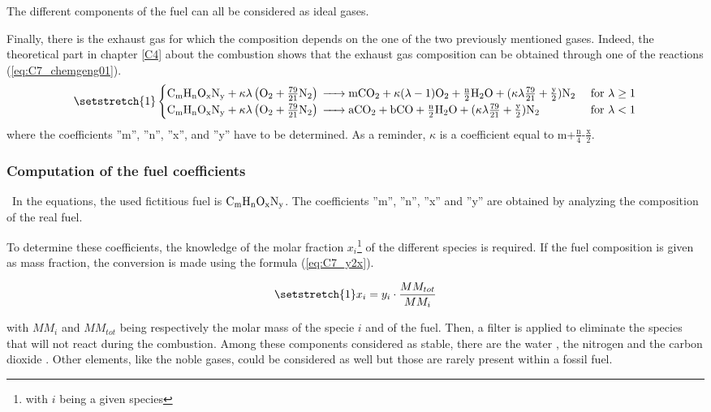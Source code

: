 The different components of the fuel can all be considered as ideal gases. 

Finally, there is the exhaust gas for which the composition depends on the one of the two previously mentioned gases. Indeed, the theoretical part in chapter \ref{C4} about the combustion shows that the exhaust gas composition can be obtained through one of the reactions (\ref{eq:C7_chemgeng01}).
\begin{equation}
    \setstretch{1}
    \begin{cases}
        \ce{C_{\text{m}}H_{\text{n}}O_{\text{x}}N_{\text{y}} +}\kappa\lambda \left(\ce{O2}+\frac{79}{21}\ce{N2}\right) \ce{-> mCO2 +} \kappa(\lambda-1)\ce{O2 + \frac{n}{2}H2O +} (\kappa\lambda\frac{79}{21} + \frac{\text{y}}{2})\ce{N2} & \text{ for \(\lambda\geq 1\)} \\
        \ce{C_{\text{m}}H_{\text{n}}O_{\text{x}}N_{\text{y}} +}\kappa\lambda \left(\ce{O2}+\frac{79}{21}\ce{N2}\right) \ce{-> aCO2 + bCO + \frac{n}{2}H2O} + (\kappa\lambda\frac{79}{21} + \frac{\text{y}}{2})\ce{N2}                      & \text{ for \(\lambda< 1\)}
    \end{cases}\label{eq:C7_chemgeng01}
\end{equation}
where the coefficients ''m'', ''n'', ''x'', and ''y'' have to be determined. As a reminder, $\kappa$ is a coefficient equal to m+$\frac{\text{n}}{4}$-$\frac{\text{x}}{2}$. 
\newpage
\subsubsection{Computation of the fuel coefficients}
\quad\ In the equations, the used fictitious fuel is $\ce{C_{\text{m}}H_{\text{n}}O_{\text{x}}N_{\text{y}}}$. The coefficients ''m'', ''n'', ''x'' and ''y'' are obtained by analyzing the composition of the real fuel.

To determine these coefficients, the knowledge of the molar fraction $x_i$\footnote{with $i$ being a given species} of the different species is required. If the fuel composition is given as mass fraction, the conversion is made using the formula (\ref{eq:C7_y2x}).

\begin{equation}
\setstretch{1}
    x_i = y_i\cdot \frac{MM_{tot}}{MM_i}\label{eq:C7_y2x}
\end{equation}

with $MM_i$ and $MM_{tot}$ being respectively the molar mass of the specie $i$ and of the fuel.
Then, a filter is applied to eliminate the species that will not react during the combustion. Among these components considered as stable, there are the water , the nitrogen  and the carbon dioxide . Other elements, like the noble gases, could be considered as well but those are rarely present within a fossil fuel.

